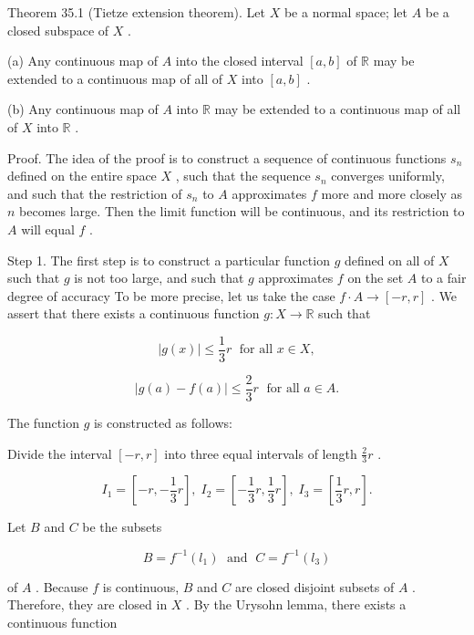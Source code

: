 Theorem 35.1 (Tietze extension theorem). Let \(X\) be a normal space; let \(A\) be a closed subspace of \(X\) .

(a) Any continuous map of \(A\) into the closed interval \(\left\lbrack  {a,b}\right\rbrack\) of \(\mathbb{R}\) may be extended to a continuous map of all of \(X\) into \(\left\lbrack  {a,b}\right\rbrack\) .

(b) Any continuous map of \(A\) into \(\mathbb{R}\) may be extended to a continuous map of all of \(X\) into \(\mathbb{R}\) .

Proof. The idea of the proof is to construct a sequence of continuous functions \({s}_{n}\) defined on the entire space \(X\) , such that the sequence \({s}_{n}\) converges uniformly, and such that the restriction of \({s}_{n}\) to \(A\) approximates \(f\) more and more closely as \(n\) becomes large. Then the limit function will be continuous, and its restriction to \(A\) will equal \(f\) .

Step 1. The first step is to construct a particular function \(g\) defined on all of \(X\) such that \(g\) is not too large, and such that \(g\) approximates \(f\) on the set \(A\) to a fair degree of accuracy To be more precise, let us take the case \(f \cdot  A \rightarrow  \left\lbrack  {-r,r}\right\rbrack\) . We assert that there exists a continuous function \(g : X \rightarrow  \mathbb{R}\) such that

\[
\left| {g\left( x\right) }\right|  \leq  \frac{1}{3}r\;\text{ for all }x \in  X,
\]

\[
\left| {g\left( a\right)  - f\left( a\right) }\right|  \leq  \frac{2}{3}r\;\text{ for all }a \in  A.
\]

The function \(g\) is constructed as follows:

Divide the interval \(\left\lbrack  {-r,r}\right\rbrack\) into three equal intervals of length \(\frac{2}{3}r\) .

\[
{I}_{1} = \left\lbrack  {-r, - \frac{1}{3}r}\right\rbrack  ,\;{I}_{2} = \left\lbrack  {-\frac{1}{3}r,\frac{1}{3}r}\right\rbrack  ,\;{I}_{3} = \left\lbrack  {\frac{1}{3}r,r}\right\rbrack  .
\]

Let \(B\) and \(C\) be the subsets

\[
B = {f}^{-1}\left( {l}_{1}\right) \;\text{ and }\;C = {f}^{-1}\left( {l}_{3}\right)
\]

of \(A\) . Because \(f\) is continuous, \(B\) and \(C\) are closed disjoint subsets of \(A\) . Therefore, they are closed in \(X\) . By the Urysohn lemma, there exists a continuous function

